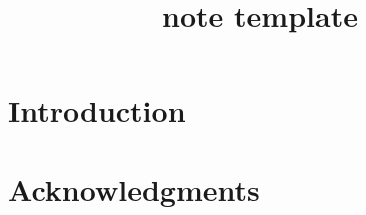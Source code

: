 \documentclass[11pt]{article} %
\title{note template}
\begin{document}
\maketitle

\begin{abstract}
\end{abstract}
\tableofcontents
\section{Introduction}

\section*{Acknowledgments}
{ 


}
\end{document}
